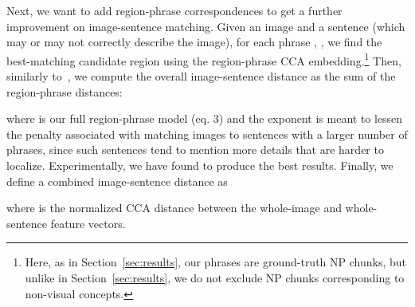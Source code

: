 \documentclass[twocolumn]{svjour3}
\begin{document}
Next, we want to add region-phrase correspondences to get a further improvement on image-sentence matching. Given an image  and a sentence  (which may or may not correctly describe the image), for each phrase , , we find the best-matching candidate region  using the region-phrase CCA embedding.\footnote{Here, as in Section~\ref{sec:results}, our phrases are ground-truth NP chunks, but unlike in Section~\ref{sec:results}, we do not exclude NP chunks corresponding to non-visual concepts.} Then, similarly to~\cite{karpathy2014deep}, we compute the overall image-sentence distance as the sum of the region-phrase distances:


where  is our full region-phrase model (eq. 3) and the exponent  is meant to lessen the penalty associated with matching images to sentences with a larger number of phrases, since such sentences tend to mention more details that are harder to localize. Experimentally, we have found  to produce the best results. Finally, we define a combined image-sentence distance as 

where  is the normalized CCA distance between the whole-image and whole-sentence feature vectors.
\end{document}
